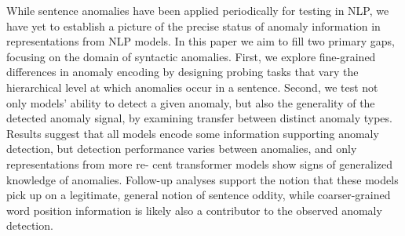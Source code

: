 While sentence anomalies have been applied periodically for testing in NLP, we have yet to establish a picture of the precise status of anomaly information in representations from NLP models. In this paper we aim to fill two primary gaps, focusing on the domain of syntactic anomalies. First, we explore fine-grained differences in anomaly encoding by designing probing tasks that vary the hierarchical level at which anomalies occur in a sentence. Second, we test not only models' ability to detect a given anomaly, but also the generality of the detected anomaly signal, by examining transfer between distinct anomaly types. Results suggest that all models encode some information supporting anomaly detection, but detection performance varies between anomalies, and only representations from more re- cent transformer models show signs of generalized knowledge of anomalies. Follow-up analyses support the notion that these models pick up on a legitimate, general notion of sentence oddity, while coarser-grained word position information is likely also a contributor to the observed anomaly detection.
